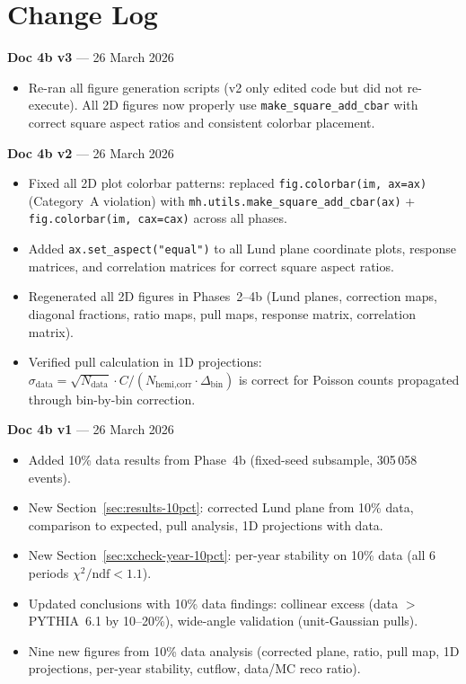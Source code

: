 \documentclass[11pt,a4paper]{article}
\begin{document}
\tableofcontents
\clearpage

\section*{Change Log}

\textbf{Doc 4b v3} --- 26 March 2026
\begin{itemize}
\item Re-ran all figure generation scripts (v2 only edited code but did not re-execute). All 2D figures now properly use \texttt{make\_square\_add\_cbar} with correct square aspect ratios and consistent colorbar placement.
\end{itemize}

\medskip

\textbf{Doc 4b v2} --- 26 March 2026
\begin{itemize}
\item Fixed all 2D plot colorbar patterns: replaced \texttt{fig.colorbar(im, ax=ax)} (Category~A violation) with \texttt{mh.utils.make\_square\_add\_cbar(ax)} + \texttt{fig.colorbar(im, cax=cax)} across all phases.
\item Added \texttt{ax.set\_aspect("equal")} to all Lund plane coordinate plots, response matrices, and correlation matrices for correct square aspect ratios.
\item Regenerated all 2D figures in Phases~2--4b (Lund planes, correction maps, diagonal fractions, ratio maps, pull maps, response matrix, correlation matrix).
\item Verified pull calculation in 1D projections: $\sigma_\text{data} = \sqrt{N_\text{data}} \cdot C / (N_\text{hemi,corr} \cdot \Delta_\text{bin})$ is correct for Poisson counts propagated through bin-by-bin correction.
\end{itemize}

\medskip

\textbf{Doc 4b v1} --- 26 March 2026
\begin{itemize}
\item Added 10\% data results from Phase~4b (fixed-seed subsample, 305\,058 events).
\item New Section~\ref{sec:results-10pct}: corrected Lund plane from 10\% data, comparison to expected, pull analysis, 1D projections with data.
\item New Section~\ref{sec:xcheck-year-10pct}: per-year stability on 10\% data (all 6 periods $\chi^2/\text{ndf} < 1.1$).
\item Updated conclusions with 10\% data findings: collinear excess (data $>$ PYTHIA~6.1 by 10--20\%), wide-angle validation (unit-Gaussian pulls).
\item Nine new figures from 10\% data analysis (corrected plane, ratio, pull map, 1D projections, per-year stability, cutflow, data/MC reco ratio).
\end{itemize}
\end{document}
